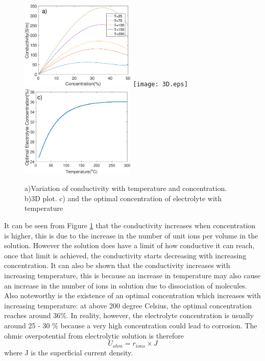 \begin{figure}[h] 
\includegraphics[width=5.5cm] {cond.eps} 
\texttt{[image: 3D.eps]}
\includegraphics[width = 5.5cm]{optimum.eps}
\caption{ a)Variation of conductivity with temperature and concentration. b)3D plot. c) and the optimal concentration of electrolyte with temperature} 
\label{fig:3D}
\end{figure} 
It can be seen from Figure \ref{fig:3D} that the conductivity increases when concentration is higher, this is due to the increase in the number of unit ions per volume in the solution. However the solution does have a limit of how conductive it can reach, once that limit is achieved, the conductivity starts decreasing with increasing concentration. It can also be shown that the conductivity increases with increasing temperature, this is because an increase in temperature may also cause an increase in the number of ions in solution due to dissociation of molecules. Also noteworthy is the existence of an optimal concentration which increases with increasing temperature: at above 200 degree Celsius, the optimal concentration reaches around 36\%. In reality, however, the electrolyte concentration is usually around 25 - 30 \% because a very high concentration could lead to corrosion.
The ohmic overpotential from electrolytic solution is therefore\
\begin{equation} 
U_{ohm} = r_{ions} \times J
\end{equation} 
where J is the superficial current density. 



